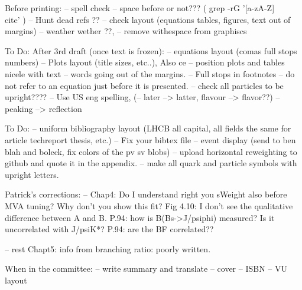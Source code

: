Before printing:
-- spell check
-- space before \cite{} or not??? ( grep -rG  '[a-zA-Z]\\cite' )
-- Hunt dead refs ??
-- check layout (equations tables, figures, text out of margins)
-- weather wether ??,
-- remove withespace from graphiscs

To Do: After 3rd draft (once text is frozen):
-- equations layout (comas full stops numbers)
-- Plots layout (title sizes, etc..), Also ce
-- position plots and tables nicele with text
-- words going out of the margins.
-- Full stops in footnotes
-- do not refer to an equation just before it is presented.
-- check all particles to be upright????
-- Use US eng spelling, (-- later --> latter, flavour --> flavor??)
-- peaking --> reflection


To Do:
-- uniform bibliography layout (LHCB all capital, all fields the same for article techreport thesis, etc.)
-- Fix your bibtex file
-- event display (send to ben blah and boleck, fix colors of the pv sv blobs)
-- upload horizontal reweighting to github and quote it in the appendix.
-- make all quark and particle symbols with upright letters.


Patrick's corrections:
-- Chap4:
Do I understand right you sWeight also before MVA tuning? Why don't you show this fit?
Fig 4.10: I don't see the qualitative difference between A and B.
P.94: how is B(Bs->J/psiphi) measured? Is it uncorrelated with J/psiK*?
P.94: are the BF correlated??

-- rest
Chapt5: info from branching ratio: poorly written.


When in the committee:
-- write summary and translate
-- cover
-- ISBN
-- VU layout
